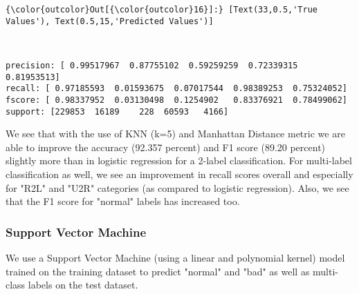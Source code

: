 \documentclass[11pt]{article}
\begin{document}
\begin{Verbatim}[commandchars=\\\{\}]
{\color{outcolor}Out[{\color{outcolor}16}]:} [Text(33,0.5,'True Values'), Text(0.5,15,'Predicted Values')]
\end{Verbatim}
            
    \begin{center}
    \end{center}
    { \hspace*{\fill} \\}
    
    \begin{Verbatim}[commandchars=\\\{\}]
precision: [ 0.99517967  0.87755102  0.59259259  0.72339315  0.81953513]
recall: [ 0.97185593  0.01593675  0.07017544  0.98389253  0.75324052]
fscore: [ 0.98337952  0.03130498  0.1254902   0.83376921  0.78499062]
support: [229853  16189    228  60593   4166]

    \end{Verbatim}

    We see that with the use of KNN (k=5) and Manhattan Distance metric we
are able to improve the accuracy (92.357 percent) and F1 score (89.20
percent) slightly more than in logistic regression for a 2-label
classification. For multi-label classification as well, we see an
improvement in recall scores overall and especially for "R2L" and "U2R"
categories (as compared to logistic regression). Also, we see that the
F1 score for "normal" labels has increased too.

    \subsubsection{Support Vector Machine}\label{support-vector-machine}

We use a Support Vector Machine (using a linear and polynomial kernel)
model trained on the training dataset to predict "normal" and "bad" as
well as multi-class labels on the test dataset.
\end{document}
